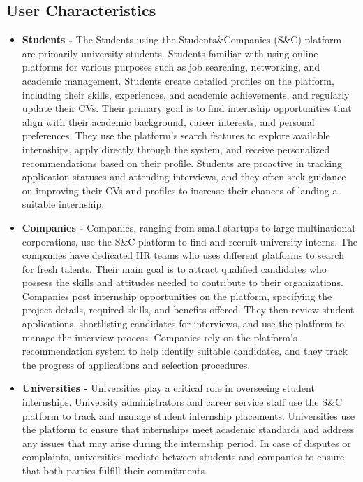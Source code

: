 \subsection{User Characteristics}
\begin{itemize}
    \item \textbf{Students - }The Students using the Students\&Companies (S\&C) platform are primarily university students. Students familiar with using online platforms for various purposes such as job searching, networking, and academic management. Students create detailed profiles on the platform, including their skills, experiences, and academic achievements, and regularly update their CVs. Their primary goal is to find internship opportunities that align with their academic background, career interests, and personal preferences. They use the platform's search features to explore available internships, apply directly through the system, and receive personalized recommendations based on their profile. Students are proactive in tracking application statuses and attending interviews, and they often seek guidance on improving their CVs and profiles to increase their chances of landing a suitable internship.
    \item \textbf{Companies - }Companies, ranging from small startups to large multinational corporations, use the S\&C platform to find and recruit university interns. The companies have dedicated HR teams who uses different platforms to search for fresh talents. Their main goal is to attract qualified candidates who possess the skills and attitudes needed to contribute to their organizations. Companies post internship opportunities on the platform, specifying the project details, required skills, and benefits offered. They then review student applications, shortlisting candidates for interviews, and use the platform to manage the interview process. Companies rely on the platform’s recommendation system to help identify suitable candidates, and they track the progress of applications and selection procedures.
    \item \textbf{Universities - }Universities play a critical role in overseeing student internships. University administrators and career service staff use the S\&C platform to track and manage student internship placements. Universities use the platform to ensure that internships meet academic standards and address any issues that may arise during the internship period. In case of disputes or complaints, universities mediate between students and companies to ensure that both parties fulfill their commitments.
\end{itemize}

